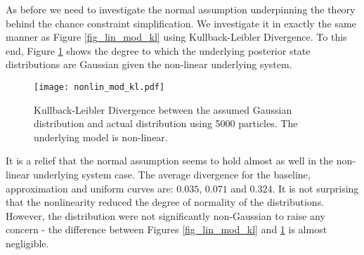 As before we need to investigate the normal assumption underpinning the theory behind the chance constraint simplification. We investigate it in exactly the same manner as Figure \ref{fig_lin_mod_kl} using Kullback-Leibler Divergence. To this end, Figure \ref{fig_nonlin_mod_kl} shows the degree to which the underlying posterior state distributions are Gaussian given the non-linear underlying system.
\begin{figure}[H] 
\centering
\texttt{[image: nonlin\_mod\_kl.pdf]}
\caption{Kullback-Leibler Divergence between the assumed Gaussian distribution and actual distribution using 5000 particles. The underlying model is non-linear.}
\label{fig_nonlin_mod_kl}
\end{figure}
It is a relief that the normal assumption seems to hold almost as well in the non-linear underlying system case. The average divergence for the baseline, approximation and uniform curves are: $0.035$, $0.071$ and $0.324$. It is not surprising that the nonlinearity reduced the degree of normality of the distributions. However, the distribution were not significantly non-Gaussian to raise any concern - the difference between Figures \ref{fig_lin_mod_kl} and \ref{fig_nonlin_mod_kl} is almost negligible.

